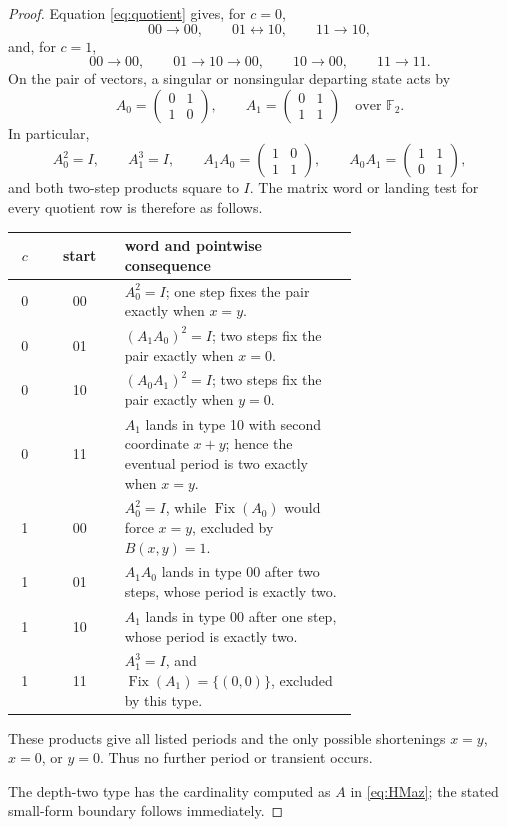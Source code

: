 \documentclass[10pt,a4paper]{amsart}
\theoremstyle{definition}
\theoremstyle{remark}
\numberwithin{equation}{section}
\newcommand{\F}{\mathbb F}
\newcommand{\Fix}{\operatorname{Fix}}
\begin{document}
\begin{proof}
Equation \eqref{eq:quotient} gives, for \(c=0\),
\[
00\to00,\qquad01\leftrightarrow10,\qquad11\to10,
\]
and, for \(c=1\),
\[
00\to00,\qquad01\to10\to00,
\qquad10\to00,\qquad11\to11.
\]
On the pair of vectors, a singular or nonsingular departing state acts by
\[
 A_0=\begin{pmatrix}0&1\\1&0\end{pmatrix},
 \qquad
 A_1=\begin{pmatrix}0&1\\1&1\end{pmatrix}
 \quad\text{over }\F_2.
\]
In particular,
\[
 A_0^2=I,\qquad A_1^3=I,\qquad
 A_1A_0=\begin{pmatrix}1&0\\1&1\end{pmatrix},\qquad
 A_0A_1=\begin{pmatrix}1&1\\0&1\end{pmatrix},
\]
and both two-step products square to \(I\).  The matrix word or landing test
for every quotient row is therefore as follows.
\begin{center}
\small
\begin{tabular}{@{}ccp{0.68\linewidth}@{}}
\toprule
\(c\)&start&word and pointwise consequence\\
\midrule
0&00&\(A_0^2=I\); one step fixes the pair exactly when \(x=y\).\\
0&01&\((A_1A_0)^2=I\); two steps fix the pair exactly when \(x=0\).\\
0&10&\((A_0A_1)^2=I\); two steps fix the pair exactly when \(y=0\).\\
0&11&\(A_1\) lands in type 10 with second coordinate \(x+y\); hence the
eventual period is two exactly when \(x=y\).\\
1&00&\(A_0^2=I\), while \(\Fix(A_0)\) would force \(x=y\), excluded by
\(B(x,y)=1\).\\
1&01&\(A_1A_0\) lands in type 00 after two steps, whose period is exactly two.\\
1&10&\(A_1\) lands in type 00 after one step, whose period is exactly two.\\
1&11&\(A_1^3=I\), and \(\Fix(A_1)=\{(0,0)\}\), excluded by this type.\\
\bottomrule
\end{tabular}
\end{center}
These products give all listed periods and the only possible shortenings
\(x=y\), \(x=0\), or \(y=0\).  Thus no further period or transient occurs.

The depth-two type has the cardinality computed as \(A\) in
\eqref{eq:HMaz}; the stated small-form boundary follows immediately.
\end{proof}
\end{document}
